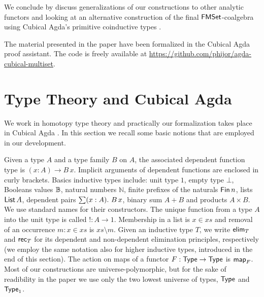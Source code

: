 \documentclass[runningheads]{llncs}
\begin{document}
We conclude by discuss generalizations of our constructions to other analytic functors and looking at an alternative construction of the final $\operatorname{\mathsf{FMSet}}$-coalgebra using Cubical Agda's primitive coinductive types \cite{Vezzosi2019}.

The material presented in the paper have been formalized in the Cubical Agda proof
assistant. The code is freely available at \url{https://github.com/phijor/agda-cubical-multiset}.

\section{Type Theory and Cubical Agda}

We work in homotopy type theory \cite{HoTTBook} and practically our formalization takes place in Cubical Agda \cite{Vezzosi2019}. In this section we recall some basic notions that are employed in our development.

Given a type $A$ and a type family $B$ on $A$, the associated dependent function type is $(x : A) \to B \, x$. Implicit arguments of dependent functions are enclosed in curly brackets. Basics inductive types include: unit type $1$, empty type $\bot$, Booleans values $\mathbb{B}$, natural numbers $ℕ$, finite prefixes of the naturals $\operatorname{\mathsf{Fin}} n$, lists $\operatorname{\mathsf{List}} A$, dependent pairs $\sum (x : A) \mathpunct{.}\, B \, x$, binary sum $A + B$ and products $A \times B$. We use standard names for their constructors. The unique function from a type $A$ into the unit type is called $! : A \to 1$. Membership in a list is $x \in xs$ and removal of an occurrence $m : x \in xs$ is $xs \setminus m$. Given an inductive type $T$, we write $\operatorname{\mathsf{elim}}_{T}$ and $\operatorname{\mathsf{rec}}_{T}$ for its dependent and non-dependent elimination  principles, respectively (we employ the same notation also for higher inductive types, introduced in the end of this section). The action on maps of a functor $F : \operatorname{\mathsf{Type}} \to \operatorname{\mathsf{Type}}$ is $\operatorname{\mathsf{map}}_{F}$. Most of our constructions are universe-polymorphic, but for the sake of readibility in the paper we use only the two lowest universe of types, $\operatorname{\mathsf{Type}}$ and $\operatorname{\mathsf{Type}}_1$.
\end{document}
